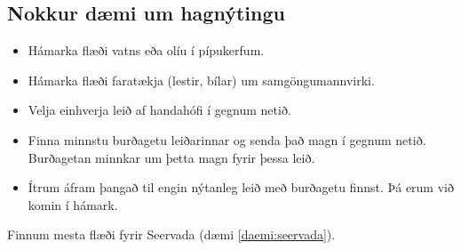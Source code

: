 \subsection*{Nokkur dæmi um hagnýtingu}
 \begin{itemize}
  \item Hámarka flæði vatns eða olíu í pípukerfum.
  \item Hámarka flæði faratækja (lestir, bílar) um samgöngumannvirki.
 \item Velja einhverja leið af handahófi í gegnum netið.
\item Finna minnstu burðagetu leiðarinnar og senda það magn í
  gegnum netið. Burðagetan minnkar um þetta magn fyrir þessa leið.
\item Ítrum áfram þangað til engin nýtanleg leið með 
  burðagetu finnst. Þá erum við komin í hámark.
\end{itemize}

\begin{daemi}
Finnum mesta flæði fyrir Seervada (dæmi \ref{daemi:seervada}). 
\end{daemi}

